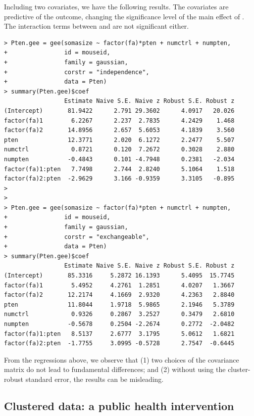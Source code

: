 Including two covariates, we have the following results. The covariates are predictive of the outcome, changing the significance level of the main effect of .  The interaction terms between  and  are not significant either. 
\begin{lstlisting}
> Pten.gee = gee(somasize ~ factor(fa)*pten + numctrl + numpten, 
+                id = mouseid, 
+                family = gaussian, 
+                corstr = "independence",
+                data = Pten)
> summary(Pten.gee)$coef 
                 Estimate Naive S.E. Naive z Robust S.E. Robust z
(Intercept)       81.9422      2.791 29.3602      4.0917   20.026
factor(fa)1        6.2267      2.237  2.7835      4.2429    1.468
factor(fa)2       14.8956      2.657  5.6053      4.1839    3.560
pten              12.3771      2.020  6.1272      2.2477    5.507
numctrl            0.8721      0.120  7.2672      0.3028    2.880
numpten           -0.4843      0.101 -4.7948      0.2381   -2.034
factor(fa)1:pten   7.7498      2.744  2.8240      5.1064    1.518
factor(fa)2:pten  -2.9629      3.166 -0.9359      3.3105   -0.895
>  
> 
> Pten.gee = gee(somasize ~ factor(fa)*pten + numctrl + numpten, 
+                id = mouseid, 
+                family = gaussian, 
+                corstr = "exchangeable",
+                data = Pten)
> summary(Pten.gee)$coef
                 Estimate Naive S.E. Naive z Robust S.E. Robust z
(Intercept)       85.3316     5.2872 16.1393      5.4095  15.7745
factor(fa)1        5.4952     4.2761  1.2851      4.0207   1.3667
factor(fa)2       12.2174     4.1669  2.9320      4.2363   2.8840
pten              11.8044     1.9718  5.9865      2.1946   5.3789
numctrl            0.9326     0.2867  3.2527      0.3479   2.6810
numpten           -0.5678     0.2504 -2.2674      0.2772  -2.0482
factor(fa)1:pten   8.5137     2.6777  3.1795      5.0612   1.6821
factor(fa)2:pten  -1.7755     3.0995 -0.5728      2.7547  -0.6445
\end{lstlisting}
 
 
From the regressions above, we observe that (1) two choices of the covariance matrix do not lead to fundamental differences; and (2) without using the cluster-robust standard error, the results can be misleading. 
 
 
 \subsection{Clustered data: a public health intervention} 

